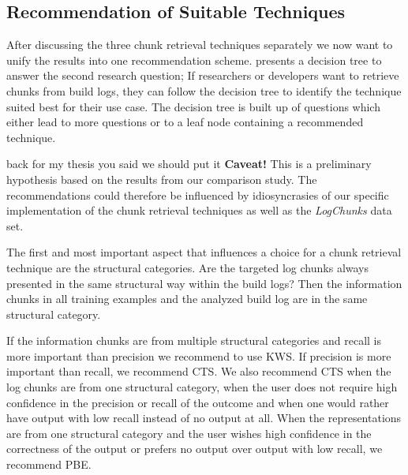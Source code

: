 \subsection{Recommendation of Suitable Techniques}
After discussing the three chunk retrieval techniques separately we
now want to unify the results into one recommendation scheme.
 presents a decision tree
to answer the second research question;
If researchers or developers want to retrieve chunks from build logs,
they can follow the decision tree to identify the technique
suited best for their use case.
The decision tree is built up of questions
which either lead to more questions or to a leaf node containing a
recommended technique.


back for my thesis you said we should put it
\textbf{Caveat!}
This is a preliminary hypothesis based on the results
from our comparison study.
The recommendations could therefore be
influenced by idiosyncrasies of our specific implementation of the
chunk retrieval techniques as well as the \emph{LogChunks}
data set.

The first and most important aspect that influences a choice for
a chunk retrieval technique are the structural categories.
Are the targeted log chunks always presented in
the same structural way within the build logs? Then the information
chunks in all training examples and the analyzed build log are in the
same structural category.

If the information chunks are from multiple structural categories
and recall is more important than precision we recommend
to use KWS\@.
If precision is more important than recall, we
recommend CTS\@.
We also recommend CTS when the log chunks are
from one structural category, when the user does not require high
confidence in the precision or recall of the outcome and when one
would rather have output with low recall instead of no output at all.
When the representations are from one structural category and the user
wishes high confidence in the correctness of the output or prefers
no output over output with low recall, we recommend PBE\@.

